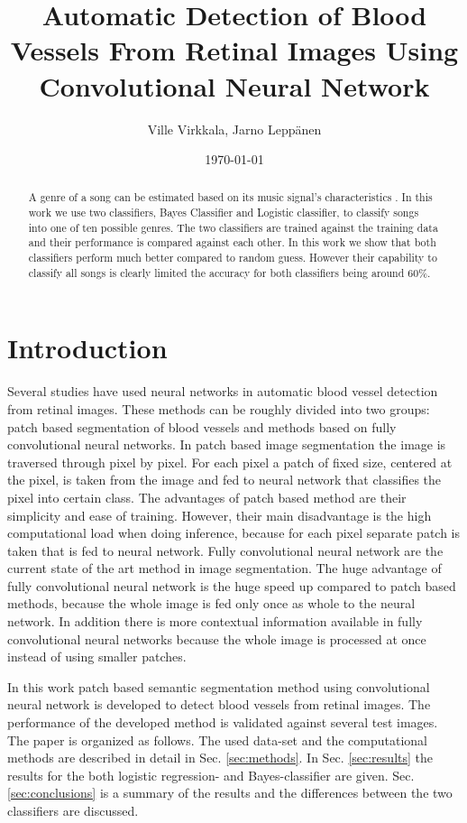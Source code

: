 \documentclass[aps,prb,10pt,twocolumn,groupedaddress]{revtex4-1}
\begin{document}
\title{Automatic Detection of Blood Vessels From Retinal Images Using Convolutional Neural Network }
\date{\today}
\author{Ville Virkkala, Jarno Leppänen}

\begin{abstract}
  A genre of a song can be estimated based on its music signal's
  characteristics . In this work we use two classifiers, Bayes Classifier
  and Logistic classifier, to classify songs into one of ten possible genres. The
  two classifiers are trained against the training data and their performance is
  compared against each other. In this work we show that both classifiers
  perform much better compared to random guess. However their capability to
  classify all songs is clearly limited the accuracy for both classifiers being
  around 60\%.
\end{abstract}

\maketitle

\section{Introduction}

Several studies have used neural networks in automatic blood vessel detection from retinal images. These methods can be roughly divided into two groups: patch based segmentation of blood vessels and methods based on fully convolutional neural networks. In patch based image segmentation the image is traversed through pixel by pixel. For each pixel a patch of fixed size, centered at the pixel, is taken from the image and fed to neural network that classifies the pixel into certain class.
The advantages of patch based method are their simplicity and ease of training. However, their main disadvantage is the high computational load when doing inference, because for each pixel separate patch is taken that is fed to neural network. Fully convolutional neural network are the current state of the art method in image segmentation. The huge advantage of fully convolutional neural network is the huge speed up compared to patch based methods, because the whole image is fed only once as whole to the neural network. In addition there is more contextual information available in fully convolutional neural networks because the whole image is processed at once instead of using smaller patches. 

In this work patch based semantic segmentation method using convolutional neural network is developed to detect blood vessels from retinal images. The performance of the developed method is validated against several test images.
The paper is organized as follows. The used data-set and the computational
methods are described in detail in Sec. \ref{sec:methods}. In Sec.
\ref{sec:results} the results for the both logistic regression- and
Bayes-classifier are given. Sec. \ref{sec:conclusions} is a
summary of the results and the differences between the two classifiers are
discussed.
\end{document}
